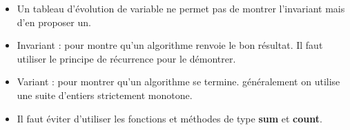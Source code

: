 \begin{itemize}
\item Un tableau d'évolution de variable ne permet pas de montrer l'invariant mais d'en proposer un.
\item Invariant : pour montre qu'un algorithme renvoie le bon résultat. Il faut utiliser le principe de récurrence pour le démontrer.
\item Variant : pour montrer qu'un algorithme se termine. généralement on utilise une suite d'entiers strictement monotone.
\item Il faut éviter d'utiliser les fonctions et méthodes de type \textbf{sum} et \textbf{count}.
\end{itemize}
